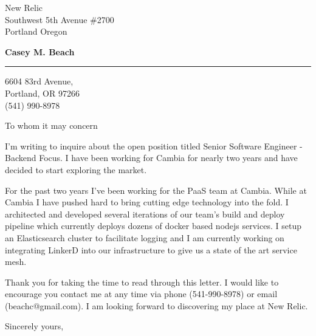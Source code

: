 \documentclass{letter} %
\begin{document}
\signature{Casey M. Beach}           %
\longindentation=0pt                       %
\let\raggedleft\raggedright                %
 
 
\begin{letter}{
New Relic \\
Southwest 5th Avenue \#2700 \\
Portland Oregon \\
}

\begin{center}
{\large\bf Casey M. Beach}
\end{center}
\medskip\hrule height 1pt
\begin{center}
6604 83rd Avenue,\\
Portland, OR 97266 \\
(541) 990-8978 
\end{center} 
\vspace{1in}

 
\opening{To whom it may concern} 
\begin{flushleft} 

\noindent I'm writing to inquire about the open position titled Senior Software Engineer - Backend Focus. I have 
been working for Cambia for nearly two years and have decided to start exploring the market.

\noindent For the past two years I've been working for the PaaS team at Cambia. While at Cambia I have pushed hard
to bring cutting edge technology into the fold. I architected and developed several iterations of our team's build and 
deploy pipeline which currently deploys dozens of docker based nodejs services. I setup an Elasticsearch cluster
to facilitate logging and I am currently working on integrating LinkerD into our infrastructure to give us a state 
of the art service mesh.

\noindent Thank you for taking the time to read through this letter. I would like to encourage you
contact me at any time via phone (541-990-8978) or email (beachc@gmail.com). I am looking forward to 
discovering my place at New Relic.

\end{flushleft}
\closing{Sincerely yours,} 
\vfill %
\end{letter}
\end{document}
